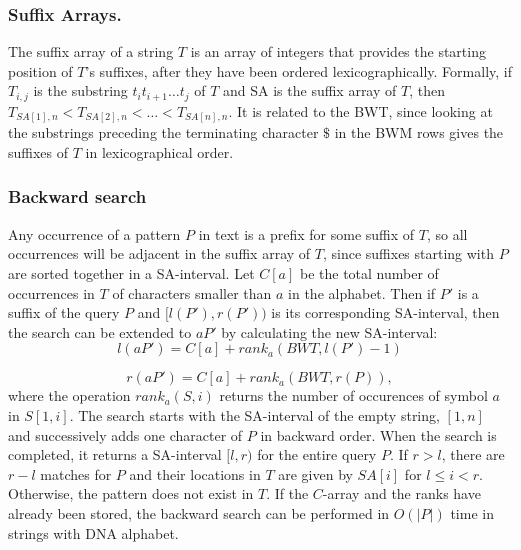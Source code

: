 \documentclass[runningheads,a4paper]{llncs}
\begin{document}
\subsubsection{Suffix Arrays.} The suffix array of a string $T$ is an array of integers that provides the starting position of $T$'s suffixes, after they have been ordered lexicographically. Formally, if $T_{i,j}$ is the substring $t_i t_{i+1} \ldots t_j$ of $T$ and SA is the suffix array of $T$, then $T_{SA[1],n}<T_{SA[2],n}<\ldots <T_{SA[n],n}$. It is related to the BWT, since looking at the substrings preceding the terminating character $\$$ in the BWM rows gives the suffixes of $T$ in lexicographical order. 
\subsubsection{Backward search}
Any occurrence of a pattern $P$ in text is a prefix for some suffix of $T$, so all occurrences will be adjacent in the suffix array of $T$, since suffixes starting with $P$ are sorted together in a SA-interval. Let $C[a]$ be the total number of occurrences in $T$ of characters smaller than $a$ in the alphabet. Then if $P'$ is a suffix of the query $P$ and $[l(P'),r(P'))$ is its corresponding SA-interval, then the search can be extended to $aP'$ by calculating the new SA-interval:
\newline
\begin{equation} 
l(aP')=C[a]+rank_{a}(BWT,l(P')-1)
\end{equation} 

\begin{equation} 
r(aP')=C[a]+rank_{a}(BWT,r(P)),
\end{equation}
where the operation $rank_a(S,i)$ returns the number of occurences of symbol $a$ in $S[1,i]$. The search starts with the SA-interval of the empty string, $[1,n]$ and successively adds one character of $P$ in backward order. When the search is completed, it returns a SA-interval $[l,r)$ for the entire query $P$. If $r > l$, there are $r-l$ matches for $P$ and their locations in $T$ are given by $SA[i]$ for $l \leq i < r$. Otherwise, the pattern does not exist in $T$. If the $C$-array and the ranks have already been stored, the backward search can be performed in $O(|P|)$ time in strings with DNA alphabet.
\end{document}
